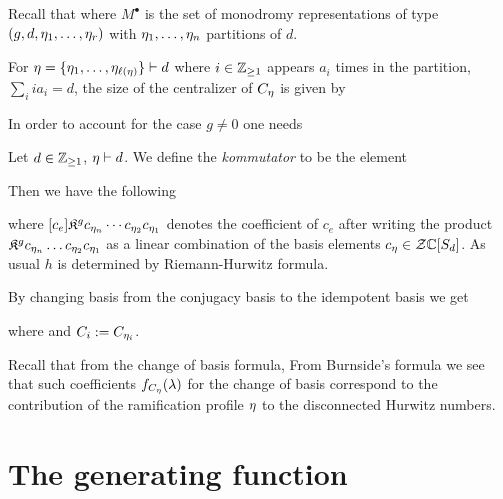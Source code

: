 \documentclass[../main/main.tex]{subfiles}
\begin{document}
Recall that 
where $M^\bullet$ is the set of monodromy representations of type $(g,d,\eta_1,\ldots,\eta_r)$ with $\eta_1,\ldots,\eta_n$ partitions of $d$. 

For $\eta=\{\eta_1,\ldots,\eta_{\ell(\eta)}\}\vdash d$ where $i\in\mathbb Z_{\geq1}$ appears $a_i$ times in the partition, $\sum_i ia_i=d$, the size of the centralizer of $C_\eta$ is given by

In order to account for the case $g\neq0$ one needs 
\begin{definition}
	Let $d\in\mathbb Z_{\geq1}$, $\eta\vdash d$. We define the \emph{kommutator} to be the element
\end{definition}

Then we have the following
\begin{proposition}[{\cite[Prop. 9.2.3]{CM}}]
	where $[c_e]\mathfrak K^gc_{\eta_n}\cdots c_{\eta_2}c_{\eta_1}$ denotes the coefficient of $c_e$ after writing the product $\mathfrak K^gc_{\eta_n}\ldots c_{\eta_2}c_{\eta_1}$ as a linear combination of the basis elements $c_\eta\in\mathcal Z\mathbb C[S_d]$. As usual $h$ is determined by Riemann-Hurwitz formula. 
\end{proposition}

By changing basis from the conjugacy basis to the idempotent basis we get

\begin{theorem}
	where
	and $C_i:=C_{\eta_i}$.
\end{theorem}

Recall that from the change of basis formula, 
From Burnside's formula we see that such coefficients $f_{C_\eta}(\lambda)$ for the change of basis correspond to the contribution of the ramification profile $\eta$ to the disconnected Hurwitz numbers. 


\section{The generating function}
\end{document}
